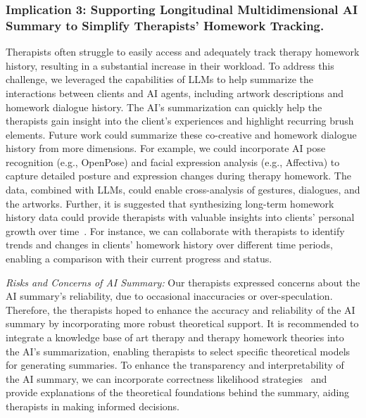 \subsubsection{Implication 3: Supporting Longitudinal Multidimensional AI Summary to Simplify Therapists' Homework Tracking.}
Therapists often struggle to easily access and adequately track therapy homework history, resulting in a substantial increase in their workload.
To address this challenge, we leveraged the capabilities of LLMs to help summarize the interactions between clients and AI agents, including artwork descriptions and homework dialogue history.
The AI's summarization can quickly help the therapists gain insight into the client's experiences and highlight recurring brush elements.
Future work could summarize these co-creative and homework dialogue history from more dimensions. 
For example, we could incorporate AI pose recognition (e.g., OpenPose) and facial expression analysis (e.g., Affectiva) to capture detailed posture and expression changes during therapy homework. 
The data, combined with LLMs, could enable cross-analysis of gestures, dialogues, and the artworks.
Further, it is suggested that synthesizing long-term homework history data could provide therapists with valuable insights into clients' personal growth over time~\cite{yang2024talk2care}. 
For instance, we can collaborate with therapists to identify trends and changes in clients' homework history over different time periods, enabling a comparison with their current progress and status.

\textit{Risks and Concerns of AI Summary:} 
Our therapists expressed concerns about the AI summary's reliability, due to occasional inaccuracies or over-speculation. 
Therefore, the therapists hoped to enhance the accuracy and reliability of the AI summary by incorporating more robust theoretical support. 
It is recommended to integrate a knowledge base of art therapy and therapy homework theories into the AI's summarization, enabling therapists to select specific theoretical models for generating summaries.
To enhance the transparency and interpretability of the AI summary, we can incorporate correctness likelihood strategies~\cite{ma2023should} and provide explanations of the theoretical foundations behind the summary, aiding therapists in making informed decisions.


